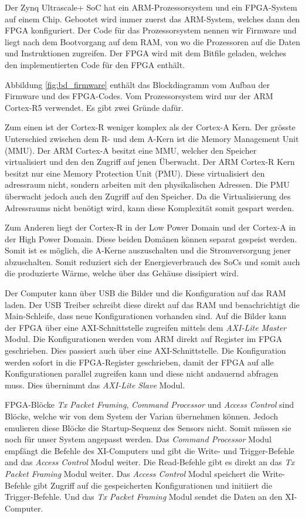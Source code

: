\documentclass{article}
\begin{document}
Der Zynq Ultrascale+ SoC hat ein ARM-Prozessorsystem und ein FPGA-System auf einem Chip. Gebootet wird immer zuerst das ARM-System, welches dann den FPGA konfiguriert. Der Code für das Prozessorsystem nennen wir Firmware und liegt nach dem Bootvorgang auf dem RAM, von wo die Prozessoren auf die Daten und Instruktionen zugreifen. Der FPGA wird mit dem Bitfile geladen, welches den implementierten Code für den FPGA enthält. 

Abbildung \ref{fig:bd_firmware} enthält das Blockdiagramm vom Aufbau der Firmware und des FPGA-Codes. Vom Prozessorsystem wird nur der ARM Cortex-R5 verwendet. Es gibt zwei Gründe dafür. 

Zum einen ist der Cortex-R weniger komplex als der Cortex-A Kern. Der grösste Unterschied zwischen dem R- und dem A-Kern ist die Memory Management Unit (MMU). Der ARM Cortex-A besitzt eine MMU, welcher den Speicher virtualisiert und den den Zugriff auf jenen Überwacht. Der ARM Cortex-R Kern besitzt nur eine Memory Protection Unit (PMU). Diese virtualisiert den adressraum nicht, sondern arbeiten mit den physikalischen Adressen. Die PMU überwacht jedoch auch den Zugriff auf den Speicher. Da die Virtualisierung des Adressraums nicht benötigt wird, kann diese Komplexität somit gespart werden. 

Zum Anderen liegt der Cortex-R in der Low Power Domain und der Cortex-A in der High Power Domain. Diese beiden Domänen können separat gespeist werden. Somit ist es möglich, die A-Kerne auszuschalten und die Stromversorgung jener abzuschalten. Somit reduziert sich der Energieverbrauch des SoCs und somit auch die produzierte Wärme, welche über das Gehäuse dis­si­pie­rt wird.

Der Computer kann über USB die Bilder und die Konfiguration auf das RAM laden. Der USB Treiber schreibt diese direkt auf das RAM und benachrichtigt die Main-Schleife, dass neue Konfigurationen vorhanden sind. Auf die Bilder kann der FPGA über eine AXI-Schnittstelle zugreifen mittels dem \textit{AXI-Lite Master} Modul. Die Konfigurationen werden vom ARM direkt auf Register im FPGA geschrieben. Dies passiert auch über eine AXI-Schnittstelle. Die Konfiguration werden sofort in die FPGA-Register geschrieben, damit der FPGA auf alle Konfigurationen parallel zugreifen kann und diese nicht andauernd abfragen muss. Dies übernimmt das \textit{AXI-Lite Slave} Modul.

FPGA-Blöcke \textit{Tx Packet Framing}, \textit{Command Processor} und \textit{Access Control} sind Blöcke, welche wir von dem System der Varian übernehmen können. Jedoch emulieren diese Blöcke die Startup-Sequenz des Sensors nicht. Somit müssen sie noch für unser System angepasst werden. Das \textit{Command Processor} Modul empfängt die Befehle des XI-Computers und gibt die Write- und Trigger-Befehle and das \textit{Access Control} Modul weiter. Die Read-Befehle gibt es direkt an das \textit{Tx Packet Framing} Modul weiter. Das \textit{Access Control} Modul speichert die Write-Befehle gibt Zugriff auf die gespeicherten Konfigurationen und initiiert die Trigger-Befehle. Und das \textit{Tx Packet Framing} Modul sendet die Daten an den XI-Computer.
\end{document}
